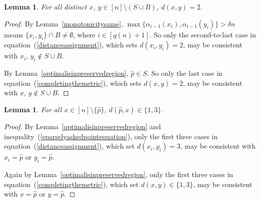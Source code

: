 \documentclass[letterpaper,12pt]{article}
\newtheorem{lemma}[theorem]{Lemma}
\newcommand{\comment}[1]{}
\begin{document}
\comment{Below is a consequence of Lemma~\ref{onlysourceofdistance1}.

\begin{lemma}\label{sourceofshortdistances}
For all distinct
$x$, $y$, $z\in[n]$, if $d(x,y)=d(x,z)=1$, then $x=\hat{p}$ and $y$,
$z\notin S\cup B$.
\end{lemma}
}




\begin{lemma}\label{ordinarydistancesare2}
For all distinct $x$, $y\in[n]\setminus (S\cup B)$,
$d\left(x,y\right)=2$.
\end{lemma}
\begin{proof}
By Lemma~\ref{monotonicitysame},
$\max\{\alpha_{i-1}(x_i),\alpha_{i-1}(y_i)\}>\delta n$
means $\{x_i,y_i\}\cap B\neq\emptyset$, where $i\in[q(n)+1]$.
So
only the second-to-last case
in equation~(\ref{distanceassignment}), which sets $d(x_i,y_i)=2$,
may be consistent
with $x_i$, $y_i\notin S\cup B$.

By
Lemma~\ref{optimalisinpreservedregion},
$\hat{p}\in S$.
So
only the last case
in equation~(\ref{completingthemetric}),
which sets $d(x,y)=2$,
may be consistent
with $x$, $y\notin S\cup B$.
\end{proof}



\comment{\begin{lemma}\label{askeddistancesincidentonoptimalpoint}
For all $i\in[q(n)]$,
$\alpha_{i-1}(\hat{p})\le\delta n$.
\end{lemma}
\begin{proof}
By Lemma~\ref{sparselyaskedpoint},
$\hat{p}\in S\setminus B$.
$\hat{p}\notin B$, which
together with equation~(\ref{badpoints}) and
Lemma~\ref{monotonicity}
completes the proof.
\end{proof}
}
\begin{lemma}\label{optimalpointdistances1or3}
For all $x\in[n]\setminus\{\hat{p}\}$,
$d(\hat{p},x)\in\{1,3\}$.
\end{lemma}
\begin{proof}
By
Lemma~\ref{optimalisinpreservedregion} and
inequality~(\ref{sparselyaskedpointequation}),
only
the first three
cases in
equation~(\ref{distanceassignment}),
which set $d(x_i,y_i)=3$,
may be consistent with
$x_i=\hat{p}$ or $y_i=\hat{p}$.

Again by Lemma~\ref{optimalisinpreservedregion},
only the first three cases in equation~(\ref{completingthemetric}),
which set $d(x,y)\in\{1,3\}$,
may be consistent with $x=\hat{p}$ or $y=\hat{p}$.
\end{proof}
\end{document}
